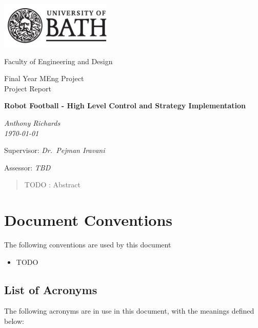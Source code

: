 \begin{titlepage}
  \setlength{\parindent}{0cm}

  \includegraphics[width=200px]{Images/uob-logo-black-transparent}

  \Large
  Faculty of Engineering and Design

  \vspace{80pt}

  \LARGE
  Final Year MEng Project \\
  Project Report

  \vspace{80pt}
  \textbf{Robot Football - High Level Control and Strategy Implementation}

  \vspace{10pt}
  \emph{Anthony Richards} \\
  \emph{\today}

  \vspace{80pt}
  Supervisor: \emph{Dr.~Pejman Iravani}

  \vspace{10pt}
  Assessor: \emph{TBD}
\end{titlepage}


\begin{abstract}
TODO : Abstract
\end{abstract}

\tableofcontents

\section*{Document Conventions}
The following conventions are used by this document

\begin{itemize}
  \item TODO
\end{itemize}

\subsection*{List of Acronyms}

The following acronyms are in use in this document, with the meanings defined
below:

